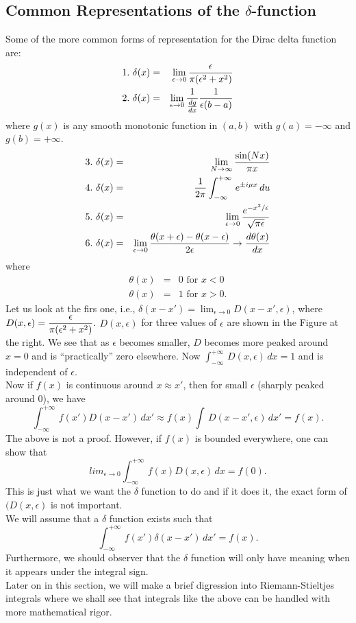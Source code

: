 \subsection{Common Representations of the $\delta$-function}
Some of the more common forms 
of representation for the Dirac delta function are:
\begin{eqnarray*}
1.\ \delta(x) &=& \lim_{\epsilon\rightarrow 0} {\epsilon\over \pi (\epsilon^2 + x^2)}\\
2.\ \delta(x) &=& \lim_{\epsilon\rightarrow 0} {1\over {dg\over dx} } {1\over \epsilon(b-a)}
\end{eqnarray*}where $g(x)$ is any smooth monotonic function in $(a,b)$ with $g(a) = -\infty$ and $g(b) = +\infty$. 
\begin{eqnarray*}
3.\ \delta(x) &=& \lim_{N\rightarrow \infty} {\sin(Nx)\over \pi x}\\
4.\ \delta(x) &=& {1\over 2\pi} \int_{-\infty}^{+\infty} \, e^{\pm i\mu x}\, du\\
5.\ \delta(x) &=& \lim_{\epsilon\rightarrow 0} {e^{-x^2/\epsilon}\over \sqrt{\pi\epsilon}}\\
6.\ \delta(x) &=& \lim_{\epsilon\rightarrow 0} {\theta(x+\epsilon) - \theta(x-\epsilon)\over 2\epsilon} \rightarrow {d\theta(x)\over dx}\\
\end{eqnarray*}where 
\begin{eqnarray*}
\theta(x) &=& 0 \mbox{ for } x<0\\
\theta(x) &=& 1 \mbox{ for } x > 0.
\end{eqnarray*}
Let us look at the firs one, i.e., 
$\delta(x-x') = \lim_{\epsilon\rightarrow 0} D(x-x',\epsilon)$, where $\displaystyle D(x,\epsilon) = {\epsilon\over \pi (\epsilon^2 + x^2)}.$
$D(x,\epsilon)$ for three values of $\epsilon$ are shown in the Figure at the right. We see that as $\epsilon$ becomes smaller, $D$ becomes more peaked around $x=0$ and is 
``practically'' zero elsewhere. Now $\displaystyle \int_{-\infty}^{+\infty} \, D(x,\epsilon)\, dx = 1$ and is independent of $\epsilon$. \\
Now if $f(x)$ is continuous around $x\approx x'$, then for small $ \epsilon$ (sharply peaked around 0), we have
$$ \int_{-\infty}^{+\infty}\, f(x') D(x-x')\,dx' \approx f(x) \int\, D(x-x',\epsilon)\, dx' = f(x).$$
The above is not a proof. However, if $f(x)$ is bounded everywhere, one can show that $$lim_{\epsilon\rightarrow 0}\int_{-\infty}^{+\infty}\, f(x) D(x,\epsilon)\, dx = f(0).$$
This is just what we want the $\delta$ function to do and if it does it, the exact form of $(D(x,\epsilon)$ is not important.\\
We will assume that a $\delta$ function exists such that 
$$\int_{-\infty}^{+\infty}\, f(x') \delta(x-x')\, dx' = f(x).$$
Furthermore, we should observer that the $\delta$ function will only have meaning when it appears under the integral sign.\\
Later on in this section, we will make a brief digression into Riemann-Stieltjes integrals where we shall see that integrals like the above can be handled with 
more mathematical rigor. \\

